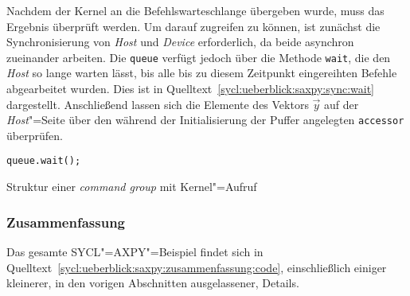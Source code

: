 Nachdem der Kernel an die Befehlswarteschlange übergeben wurde, muss das
Ergebnis überprüft werden. Um darauf zugreifen zu können, ist zunächst die
Synchronisierung von \textit{Host} und \textit{Device} erforderlich, da beide
asynchron zueinander arbeiten. Die \texttt{queue} verfügt jedoch über die
Methode \texttt{wait}, die den \textit{Host} so lange warten lässt, bis alle bis
zu diesem Zeitpunkt eingereihten Befehle abgearbeitet wurden. Dies ist in
Quelltext~\ref{sycl:ueberblick:saxpy:sync:wait} dargestellt. Anschließend
lassen sich die Elemente des Vektors $\vec{y}$ auf der \textit{Host}"=Seite
über den während der Initialisierung der Puffer angelegten \texttt{accessor}
überprüfen.

\begin{code}
    \begin{verbatim}
queue.wait();
    \end{verbatim}
    \caption{Struktur einer \textit{command group} mit Kernel"=Aufruf}
    \label{sycl:ueberblick:saxpy:sync:wait}
\end{code}

\subsubsection{Zusammenfassung}
\label{sycl:ueberblick:saxpy:zusammenfassung}

Das gesamte SYCL"=AXPY"=Beispiel findet sich in
Quelltext~\ref{sycl:ueberblick:saxpy:zusammenfassung:code}, einschließlich
einiger kleinerer, in den vorigen Abschnitten ausgelassener, Details.

